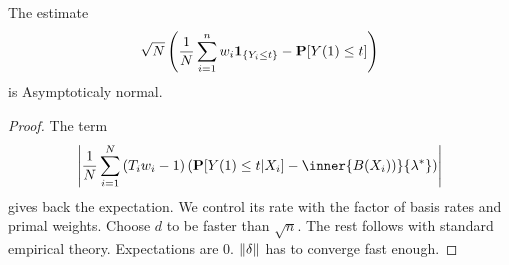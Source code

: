 \begin{theorem}
  The estimate 
  \begin{gather}
    \sqrt{N}
    \left( 
  \frac{1}{N}
    \sum_{i=1}^{n} 
    w_i
    \mathbf{1}
    _{\left\{ Y_i\le t \right\}}
    -
    \P[Y(1)\le t]
    \right)
  \end{gather}
  is Asymptoticaly normal.
\end{theorem}
\begin{proof}
The term 
\begin{gather}
    \left|  
  \frac{1}{N}
    \sum_{i=1}^{N} 
    \left( 
    T_i
    w_i
    -
    1
    \right)
    \left( 
    \P[Y(1)\le t | X_i]
    -
    \inner
    {B(X_i))}
    {\lambda^*}
    \right)
  \right|
\end{gather}
gives back the expectation. We control its rate 
with the factor of basis rates and primal weights.
Choose $d$ to be faster than $\sqrt{n}$.
The rest follows with standard empirical theory.
Expectations are 0.
$\norm{\delta}$ has to converge fast enough.
\end{proof}
